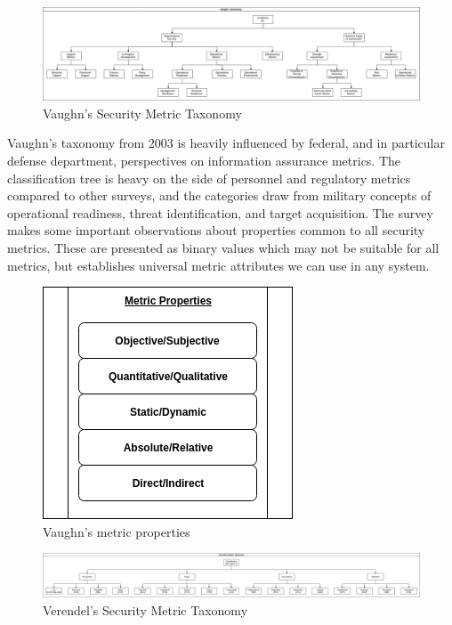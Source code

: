 

\begin{figure}[ht]
\centering
\includegraphics[width=.95\linewidth]{resource/img/ch_background/cybok_metrics/vaughn_taxonomy.png}
\caption{Vaughn's Security Metric Taxonomy\cite{Vaughn_Henning_Siraj_2003}}
\label{fig:background:vaughn_taxonomy}
\end{figure} 

Vaughn’s taxonomy\cite{Vaughn_Henning_Siraj_2003} from 2003 is heavily influenced by federal, and in particular defense department, perspectives on information assurance metrics. The classification tree is heavy on the side of personnel and regulatory metrics compared to other surveys, and the categories draw from military concepts of operational readiness, threat identification, and target acquisition. The survey makes some important observations about properties common to all security metrics. These are presented as binary values which may not be suitable for all metrics, but establishes universal metric attributes we can use in any system.


\begin{figure}[ht]
\centering
\includegraphics[width=.35\linewidth]{resource/img/ch_background/cybok_metrics/vaughn_metric_propertie.png}
\caption{Vaughn's metric properties\cite{Vaughn_Henning_Siraj_2003}}
\label{fig:background:vaughn_metric_props}
\end{figure} 



\begin{figure}[ht]
\centering
\includegraphics[width=.95\linewidth]{resource/img/ch_background/cybok_metrics/verendel_model_taxonomy.png}
\caption{Verendel's Security Metric Taxonomy \cite{Verendel_2009}}
\label{fig:background:verendel_taxonomy}
\end{figure} 

